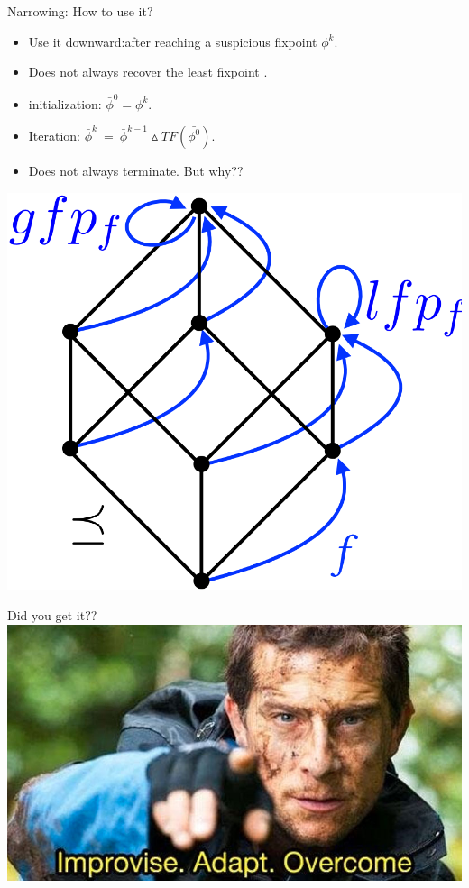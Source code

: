 \begin{frame}{Narrowing: How to use it?}
\begin{itemize}
	\item Use it downward:after reaching a suspicious fixpoint $\phi^k$.
	\item Does not always recover the least fixpoint .
	\item initialization: $\bar{\phi}^0 = \phi^k$.
	\item Iteration: $\bar{\phi}^k~=~\bar{\phi}^{k-1} \vartriangle TF(\bar{\phi^0}).$ 
	\item Does not always terminate. But why??
	\end{itemize}
\centering \includegraphics[scale=0.25]{content/images/static-analysis/lfp.png}
\end{frame}


\begin{frame}{Did you get it??}
\centering \includegraphics[scale=0.25]{content/images/static-analysis/overcome.jpg}
\end{frame}


